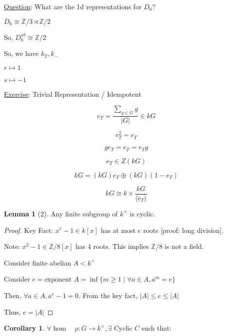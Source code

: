 \documentclass{article}
\theoremstyle{definition}
\newtheorem{lemma}[theorem]{Lemma}
\newtheorem{corollary}[theorem]{Corollary}
\begin{document}
\underline{Question}: What are the 1d representations for \(D_6\)?

\(D_6 \cong \mathbb{Z} /3 \rtimes \mathbb{Z}/2\) 

So, \(D_6^{ab} \cong \mathbb{Z} / 2\) 

So, we have \(k_T, k_-\) 

\(r \mapsto 1\) 

\(s \mapsto -1\) 

\underline{Exercise}: Trivial Representation / Idempotent

\[
    e_T = \frac{\sum_{g\in G} g}{\vert G \vert } \in kG
\]

\[
    e_T^2 = e_T
\]

\[
    g e_T = e_T = e_T g
\]

\[
    e_T \in Z(kG)
\]

\[
    kG = (kG)e_T \oplus (kG)(1-e_T)
\]

\[
    kG \cong k \times \frac{kG}{\langle e_T \rangle }
\]

\begin{lemma}
    [2] Any finite subgroup of \(k^\times\) is cyclic.
\end{lemma}

\begin{proof}
    Key Fact: \(x^e - 1 \in k[x]\) has at most \(e\) roots [proof: long division].

    Note: \(x^2 - 1 \in \mathbb{Z} / 8 [x]\) has 4 roots. This implies \(\mathbb{Z} / 8\) is not a field.

    Consider finite abelian \(A < k^\times\) 

    Consider \(e = \text{exponent } A = \inf \{ m \geq 1 \mid \forall a\in A, a^m = e \}\)
    
    Then, \(\forall a\in A, a^e - 1 = 0\). From the key fact, \(\vert A \vert \leq e \leq \vert A \vert\)
    
    Thus, \(e = \vert A \vert \) 
\end{proof}

\begin{corollary}
    \(\forall \hom \quad \rho : G \to k^\times ,\exists\) Cyclic \(C\) such that:

    \begin{center}
    \end{center}

\end{corollary}
\end{document}
